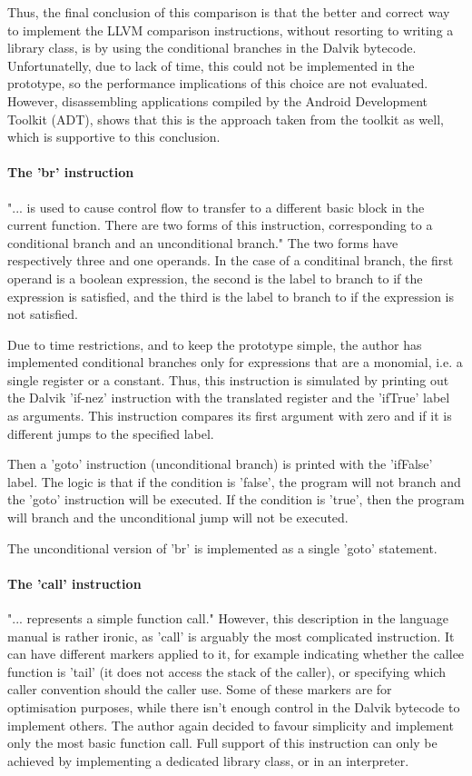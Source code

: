 \documentclass[parskip]{cs4rep}
\begin{document}
Thus, the final conclusion of this comparison is that the better and correct way to implement the LLVM comparison instructions, without resorting to writing a library class, is by using the conditional branches in the Dalvik bytecode. Unfortunatelly, due to lack of time, this could not be implemented in the prototype, so the performance implications of this choice are not evaluated. However, disassembling applications compiled by the Android Development Toolkit (ADT), shows that this is the approach taken from the toolkit as well, which is supportive to this conclusion.

\paragraph{The 'br' instruction} "... is used to cause control flow to transfer to a different basic block in the current function. There are two forms of this instruction, corresponding to a conditional branch and an unconditional branch."\cite{P11} The two forms have respectively three and one operands. In the case of a conditinal branch, the first operand is a boolean expression, the second is the label to branch to if the expression is satisfied, and the third is the label to branch to if the expression is not satisfied.

Due to time restrictions, and to keep the prototype simple, the author has implemented conditional branches only for expressions that are a monomial, i.e. a single register or a constant. Thus, this instruction is simulated by printing out the Dalvik 'if-nez' instruction with the translated register and the 'ifTrue' label as arguments. This instruction compares its first argument with zero and if it is different jumps to the specified label.

Then a 'goto' instruction (unconditional branch) is printed with the 'ifFalse' label. The logic is that if the condition is 'false', the program will not branch and the 'goto' instruction will be executed. If the condition is 'true', then the program will branch and the unconditional jump will not be executed.

The unconditional version of 'br' is implemented as a single 'goto' statement.

\paragraph{The 'call' instruction} "... represents a simple function call."\cite{P11} However, this description in the language manual is rather ironic, as 'call' is arguably the most complicated instruction. It can have different markers applied to it, for example indicating whether the callee function is 'tail' (it does not access the stack of the caller), or specifying which caller convention should the caller use. Some of these markers are for optimisation purposes, while there isn't enough control in the Dalvik bytecode to implement others. The author again decided to favour simplicity and implement only the most basic function call. Full support of this instruction can only be achieved by implementing a dedicated library class, or in an interpreter.
\end{document}

